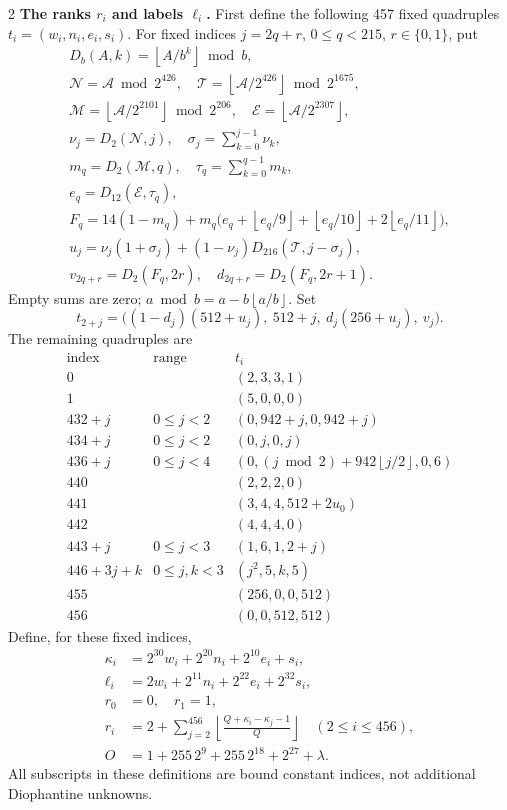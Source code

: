 \documentclass[10pt]{article}
\let\bigsum\sum
\renewcommand{\sum}{\bigsum\nolimits}
\newcommand{\fl}[1]{\left\lfloor #1\right\rfloor}
\begin{document}
\begin{multicols}{2}
\textbf{The ranks $r_i$ and labels $\ell_i$.}
First define the following 457 fixed quadruples
$t_i=(w_i,n_i,e_i,s_i)$.
For fixed indices $j=2q+r$, $0\le q<215$, $r\in\{0,1\}$, put
\[
\begin{gathered}
D_b(A,k)=\fl{A/b^k}\bmod b,\\
\mathcal N=\mathcal A\bmod2^{426},\quad
\mathcal T=\fl{\mathcal A/2^{426}}\bmod2^{1675},\\
\mathcal M=\fl{\mathcal A/2^{2101}}\bmod2^{206},\quad
\mathcal E=\fl{\mathcal A/2^{2307}},\\
\nu_j=D_2(\mathcal N,j),\quad \sigma_j=\sum_{k=0}^{j-1}\nu_k,\\
m_q=D_2(\mathcal M,q),\quad \tau_q=\sum_{k=0}^{q-1}m_k,\\
e_q=D_{12}(\mathcal E,\tau_q),\\
F_q=14(1-m_q)+m_q\bigl(e_q+\fl{e_q/9}+\fl{e_q/10}+2\fl{e_q/11}\bigr),\\
u_j=\nu_j(1+\sigma_j)+(1-\nu_j)D_{216}(\mathcal T,j-\sigma_j),\\
v_{2q+r}=D_2(F_q,2r),\quad d_{2q+r}=D_2(F_q,2r+1).
\end{gathered}
\]
Empty sums are zero; $a\bmod b=a-b\fl{a/b}$. Set
\[
t_{2+j}=\bigl((1-d_j)(512+u_j),\ 512+j,\ d_j(256+u_j),\ v_j\bigr).
\]
The remaining quadruples are
\[
\begin{array}{c|c|l}
\text{index}&\text{range}&t_i\\\hline
0&& (2,3,3,1)\\
1&& (5,0,0,0)\\
432+j&0\le j<2&(0,942+j,0,942+j)\\
434+j&0\le j<2&(0,j,0,j)\\
436+j&0\le j<4&(0,(j\bmod2)+942\fl{j/2},0,6)\\
440&&(2,2,2,0)\\
441&&(3,4,4,512+2u_0)\\
442&&(4,4,4,0)\\
443+j&0\le j<3&(1,6,1,2+j)\\
446+3j+k&0\le j,k<3&(j^2,5,k,5)\\
455&&(256,0,0,512)\\
456&&(0,0,512,512)
\end{array}
\]
Define, for these fixed indices,
\begin{align*}
\kappa_i&=2^{30}w_i+2^{20}n_i+2^{10}e_i+s_i,\\
\ell_i&=2w_i+2^{11}n_i+2^{22}e_i+2^{32}s_i,\\
r_0&=0,\quad r_1=1,\\
r_i&=2+\sum_{j=2}^{456}\fl{\frac{Q+\kappa_i-\kappa_j-1}{Q}}
 \quad(2\le i\le456),\\
O&=1+255\,2^9+255\,2^{18}+2^{27}+\lambda.
\end{align*}
All subscripts in these definitions are bound constant indices, not
additional Diophantine unknowns.


\end{multicols}
\end{document}
